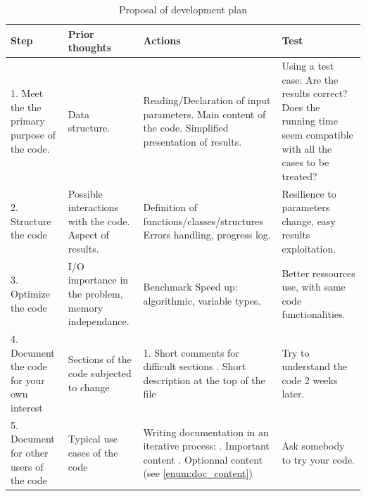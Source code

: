 \documentclass[11pt]{article}
\begin{document}
			\begin{table}[h!]
				\scriptsize
				\centering
				\caption{Proposal of development plan}
				\begin{tabular}{|p{3cm}|p{3cm}|p{4cm}|p{5cm}|}
					\hline
					\textbf{Step} & \textbf{Prior thoughts} & \textbf{Actions} & \textbf{Test} \\
					\hline
					1. Meet the the primary purpose of the code.
					&
					Data structure.
					&
					Reading/Declaration of input parameters. \newline
					Main content of the code. \newline
					Simplified presentation of results.
					& Using a test case: \newline
					Are the results correct? \newline
					Does the running time seem compatible with all the cases to be treated?
					\\
					\hline
					2. Structure the code
					& Possible interactions with the code. \newline
					Aspect of results.
					& Definition of functions/classes/structures \newline
					Errors handling, progress log.
					& Resilience to parameters change, easy results exploitation.
					\\
					\hline
					3. Optimize the code
					& I/O importance in the problem, memory independance.
					& Benchmark \newline
					Speed up: algorithmic, variable types.
					& Better ressources use, with same code functionalities. \\
					\hline
					4. Document the code for your own interest
					& Sections of the code subjected to change
					& 1. Short comments for difficult sections \newline
					2. Short description at the top of the file
					& Try to understand the code 2 weeks later. \\
					\hline
					5. Document for other users of the code
					& Typical use cases of the code
					& Writing documentation in an iterative process: \newline
					1. Important content \newline
					2. Optionnal content \newline
					(see \ref{enum:doc_content})
					& Ask somebody to try your code.
					\\
					\hline


				\end{tabular}\label{tab:table}
			\end{table}
\end{document}
